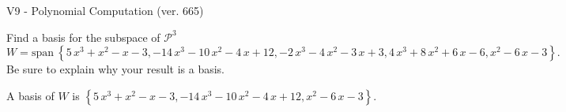 \begin{exercise}
  \begin{exerciseTitle}V9 - Polynomial Computation (ver. 665)\end{exerciseTitle}
  \begin{exerciseStatement}
    Find a basis for the subspace of \(\mathcal{P}^3\) 
\[W=\mathrm{span}\ \left\{5 \, x^{3} + x^{2} - x - 3 , -14 \, x^{3} - 10 \, x^{2} - 4 \, x + 12 , -2 \, x^{3} - 4 \, x^{2} - 3 \, x + 3 , 4 \, x^{3} + 8 \, x^{2} + 6 \, x - 6 , x^{2} - 6 \, x - 3\right\}.\]
 Be sure to explain why your result is a basis.


  \end{exerciseStatement}
  \begin{exerciseAnswer}
   A basis of \(W\) is  \(\left\{5 \, x^{3} + x^{2} - x - 3 , -14 \, x^{3} - 10 \, x^{2} - 4 \, x + 12 , x^{2} - 6 \, x - 3\right\}\).
  


  \end{exerciseAnswer}
\end{exercise}